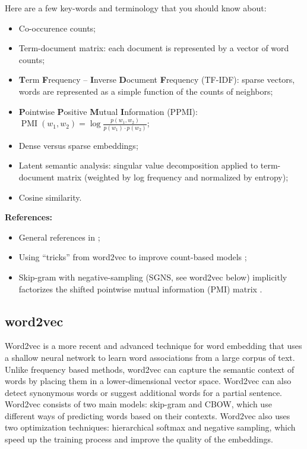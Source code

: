 \documentclass[11pt, a4paper]{amsart}
\begin{document}
Here are a few key-words and terminology that you should know about:
\begin{itemize}
	\item Co-occurence counts;
	\item Term-document matrix: each document is represented by a vector of word counts;
	\item \textbf{T}erm \textbf{F}requency -- \textbf{I}nverse \textbf{D}ocument \textbf{F}requency (TF-IDF):
	sparse vectors, words are represented as a simple function of the counts of neighbors;
	\item \textbf{P}ointwise \textbf{P}ositive \textbf{M}utual \textbf{I}nformation (PPMI):
	$\operatorname{PMI}(w_{1}, w_{2}) = \log \frac{p(w_{1}, w_{2})}{p(w_{1}) \cdot p(w_{2})}$;
	\item Dense versus sparse embeddings;
	\item Latent semantic analysis:
	singular value decomposition applied to term-document matrix (weighted by log frequency and normalized by entropy);
	\item Cosine similarity.
\end{itemize}

\noindent \textbf{References:}
\begin{itemize}
    \item General references in ;
    \item Using ``tricks'' from word2vec to improve count-based models \cite{levy-etal-2015-improving};
    \item Skip-gram with negative-sampling (SGNS, see word2vec below) implicitly factorizes the shifted pointwise mutual information (PMI) matrix \cite{NIPS2014_feab05aa}.
\end{itemize}

\subsection{word2vec}

Word2vec is a more recent and advanced technique for word embedding that uses a shallow neural network to learn word associations from a large corpus of text.
Unlike frequency based methods, word2vec can capture the semantic context of words by placing them in a lower-dimensional vector space.
Word2vec can also detect synonymous words or suggest additional words for a partial sentence. 
Word2vec consists of two main models: skip-gram and CBOW, which use different ways of predicting words based on their contexts.
Word2vec also uses two optimization techniques: hierarchical softmax and negative sampling, which speed up the training process and improve the quality of the embeddings.
\end{document}
